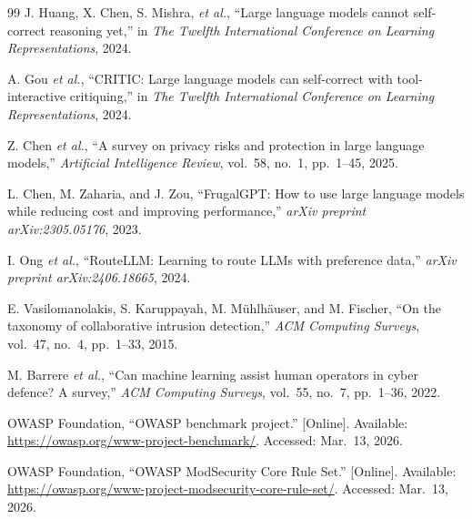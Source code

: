 \begin{thebibliography}{99}
J. Huang, X. Chen, S. Mishra, \emph{et al.}, ``Large language models cannot self-correct reasoning yet,'' in \emph{The Twelfth International Conference on Learning Representations}, 2024.

A. Gou \emph{et al.}, ``CRITIC: Large language models can self-correct with tool-interactive critiquing,'' in \emph{The Twelfth International Conference on Learning Representations}, 2024.

Z. Chen \emph{et al.}, ``A survey on privacy risks and protection in large language models,'' \emph{Artificial Intelligence Review}, vol.~58, no.~1, pp.~1--45, 2025.

L. Chen, M. Zaharia, and J. Zou, ``FrugalGPT: How to use large language models while reducing cost and improving performance,'' \emph{arXiv preprint arXiv:2305.05176}, 2023.

I. Ong \emph{et al.}, ``RouteLLM: Learning to route LLMs with preference data,'' \emph{arXiv preprint arXiv:2406.18665}, 2024.

E. Vasilomanolakis, S. Karuppayah, M. M{\"u}hlh{\"a}user, and M. Fischer, ``On the taxonomy of collaborative intrusion detection,'' \emph{ACM Computing Surveys}, vol.~47, no.~4, pp.~1--33, 2015.

M. Barrere \emph{et al.}, ``Can machine learning assist human operators in cyber defence? A survey,'' \emph{ACM Computing Surveys}, vol.~55, no.~7, pp.~1--36, 2022.

OWASP Foundation, ``OWASP benchmark project.'' [Online]. Available: \url{https://owasp.org/www-project-benchmark/}. Accessed: Mar.~13, 2026.

OWASP Foundation, ``OWASP ModSecurity Core Rule Set.'' [Online]. Available: \url{https://owasp.org/www-project-modsecurity-core-rule-set/}. Accessed: Mar.~13, 2026.

\end{thebibliography}

